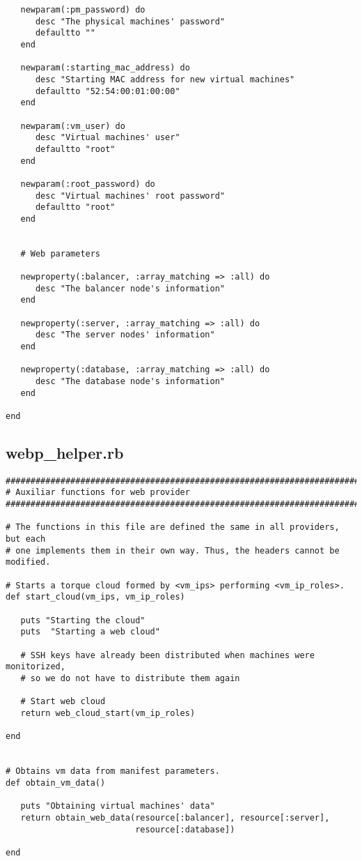 \begin{lstlisting}
   newparam(:pm_password) do
      desc "The physical machines' password"
      defaultto ""
   end

   newparam(:starting_mac_address) do
      desc "Starting MAC address for new virtual machines"
      defaultto "52:54:00:01:00:00"
   end

   newparam(:vm_user) do
      desc "Virtual machines' user"
      defaultto "root"
   end

   newparam(:root_password) do
      desc "Virtual machines' root password"
      defaultto "root"
   end


   # Web parameters
   
   newproperty(:balancer, :array_matching => :all) do
      desc "The balancer node's information"
   end
   
   newproperty(:server, :array_matching => :all) do
      desc "The server nodes' information"
   end
   
   newproperty(:database, :array_matching => :all) do
      desc "The database node's information"
   end

end
\end{lstlisting}


\subsection{webp\_helper.rb}


\begin{lstlisting}
################################################################################
# Auxiliar functions for web provider
################################################################################

# The functions in this file are defined the same in all providers, but each
# one implements them in their own way. Thus, the headers cannot be modified.

# Starts a torque cloud formed by <vm_ips> performing <vm_ip_roles>.
def start_cloud(vm_ips, vm_ip_roles)

   puts "Starting the cloud"
   puts  "Starting a web cloud"
   
   # SSH keys have already been distributed when machines were monitorized,
   # so we do not have to distribute them again
   
   # Start web cloud
   return web_cloud_start(vm_ip_roles)

end


# Obtains vm data from manifest parameters.
def obtain_vm_data()

   puts "Obtaining virtual machines' data"
   return obtain_web_data(resource[:balancer], resource[:server],
                          resource[:database])
   
end
\end{lstlisting}


